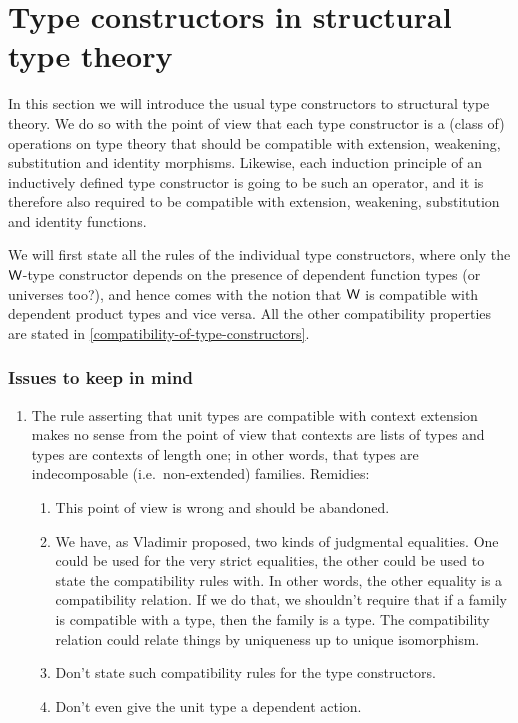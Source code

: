 \section{Type constructors in structural type theory}
\label{tt_constructors}
In this section we will introduce the usual type constructors to structural
type theory. We do so with the point of view that each type constructor is a
(class of) operations on type theory that should be compatible with extension,
weakening, substitution and identity morphisms. Likewise, each induction
principle of an inductively defined type constructor is going to be such an
operator, and it is therefore also required to be compatible with extension,
weakening, substitution and identity functions.

We will first state all the rules of the individual type constructors, where
only the ${\mathsf{W}}$-type constructor depends on the presence of dependent
function types (or universes too?), and hence comes with the notion that ${\mathsf{W}}$
is compatible with dependent product types and vice versa. All the other
compatibility properties are stated in \autoref{compatibility-of-type-constructors}.

\subsubsection{Issues to keep in mind}
\begin{enumerate}
\item The rule asserting that unit types are compatible with context extension makes
no sense from the point of view that contexts are lists of types and types
are contexts of length one; in other words, that types are indecomposable (i.e.~non-extended)
families. Remidies:
\begin{enumerate}
\item This point of view is wrong and should be abandoned.
\item We have, as Vladimir proposed, two kinds of judgmental equalities. One
      could be used for the very strict equalities, the other could be used
      to state the compatibility rules with. In other words, the other equality
      is a compatibility relation. If we do that, we shouldn't require that
      if a family is compatible with a type, then the family is a type. The
      compatibility relation could relate things by uniqueness up to unique
      isomorphism.
\item Don't state such compatibility rules for the type constructors.
\item Don't even give the unit type a dependent action.
\end{enumerate}
\end{enumerate}

